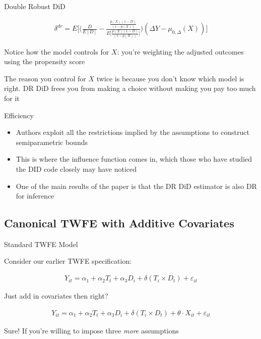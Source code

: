 \documentclass{beamer}
\begin{document}
\begin{frame}{Double Robust DiD}

\begin{eqnarray*}
\delta^{dr} = E \bigg [ \bigg ( \frac{D}{E[D]} -\frac{ \frac{p(X)(1-D)}{(1-p(X))} }{E \bigg [\frac{p(X)(1-D)}{(1-p(X))} \bigg ]} \bigg  )( \Delta Y - \mu_{0,\Delta}(X)) \bigg ]
\end{eqnarray*}

Notice how the model controls for $X$: you're weighting the adjusted outcomes using the propensity score

\bigskip

The reason you control for $X$ twice is because you don't know which model is right.  DR DiD frees you from making a choice without making you pay too much for it


\end{frame}

\begin{frame}{Efficiency}

\begin{itemize}
\item Authors exploit all the restrictions implied by the assumptions to construct semiparametric bounds
\item This is where the influence function comes in, which those who have studied the DID code closely may have noticed
\item One of the main results of the paper is that the DR DiD estimator is also DR for inference
\end{itemize}

\end{frame}

\subsection{Canonical TWFE with Additive Covariates}

\begin{frame}{Standard TWFE Model}

Consider our earlier TWFE specification:

\begin{eqnarray*}
Y_{it} = \alpha_1  + \alpha_2 T_t + \alpha_3 D_i +  \delta (T_i \times D_t)  + \varepsilon_{it}
\end{eqnarray*}

\bigskip

Just add in covariates then right?

\begin{eqnarray*}
Y_{it} = \alpha_1  + \alpha_2 T_t + \alpha_3 D_i  + \delta (T_i \times D_t) + \theta \cdot X_{it} + \varepsilon_{it}
\end{eqnarray*}

Sure! If you're willing to impose three \emph{more} assumptions

\end{frame}
\end{document}
